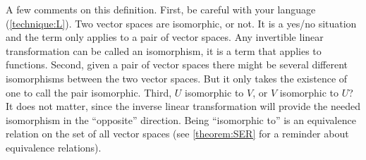 \documentclass{ximera}
\begin{document}
A few comments on this definition.  First, be careful with your language (\ref{technique:L}).  Two vector spaces are isomorphic, or not.  It is a yes/no situation and the term only applies to a pair of vector spaces.  Any invertible linear transformation can be called an isomorphism, it is a term that applies to functions.  Second, given a pair of vector spaces there might be several different isomorphisms between the two vector spaces.  But it only takes the existence of one to call the pair isomorphic.  Third,  $U$ isomorphic to $V$, or $V$ isomorphic to $U$?  It does not matter, since the inverse linear transformation will provide the needed isomorphism in the ``opposite'' direction.  Being ``isomorphic to'' is an equivalence relation on the set of all vector spaces (see \ref{theorem:SER} for a reminder about equivalence relations).
\end{document}
